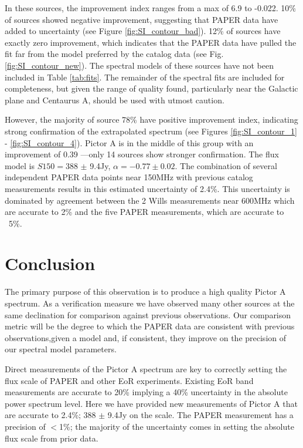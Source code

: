 \documentclass[preprint]{aastex}
\begin{document}
In these sources, the improvement index ranges from a max of 6.9 to -0.022.
10\% of sources showed negative improvement, suggesting that PAPER data have
added to uncertainty (see Figure \ref{fig:SI_contour_bad}). 12\% of sources
have exactly zero improvement, which indicates that the PAPER data have pulled
the fit far from the model preferred by the catalog data (see Fig.
\ref{fig:SI_contour_new}).  The spectral models of these sources have not been
included in Table \ref{tab:fits}.  The remainder of the spectral fits are
included for completeness, but given the range of quality found, particularly
near the Galactic plane and Centaurus A, should be used with utmost caution.

However, the majority of source 78\% have positive improvement index,
indicating strong confirmation of the extrapolated spectrum (see Figures
\ref{fig:SI_contour_1} - \ref{fig:SI_contour_4}).  Pictor A is in the middle of
this group  with an improvement of 0.39 ---only 14 sources show stronger
confirmation.  The flux model is $S150=$388 $\pm$ 9.4Jy, $\alpha=-0.77\pm0.02$.
The combination of several independent PAPER data points near 150MHz with
previous catalog measurements results in this estimated uncertainty of 2.4\%.
This uncertainty is dominated by agreement between the 2 Wills measurements
near 600MHz which are accurate to 2\% and the five PAPER measurements, which
are accurate to ~5\%.


 \section{Conclusion}
 \label{sec:Conclusion}

The primary purpose of this observation is to produce a high quality Pictor A
spectrum. As a verification measure we have observed many other sources at the
same declination for comparison against previous observations.  Our comparison
metric will be the degree to which the PAPER data are consistent with previous
observations,given a model and, if consistent, they improve on the precision of
our spectral model parameters.
 
Direct measurements of the Pictor A spectrum are key to correctly setting the
flux scale of PAPER and other EoR experiments. Existing EoR band measurements
are accurate to 20\% implying a 40\% uncertainty in the absolute power spectrum
level.  Here we have provided new measurements of Pictor A that are accurate to
2.4\%;  388 $\pm$ 9.4Jy on the \citet{Baars:1977p9678} scale. The PAPER
measurement has a precision of $<$1\%; the majority of the uncertainty comes in
setting the absolute flux scale from prior data.  
\end{document}
